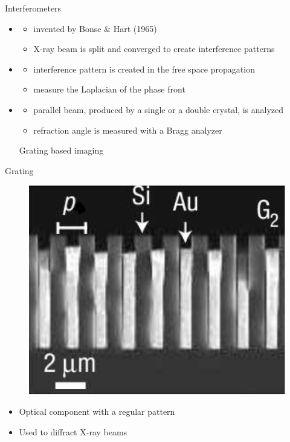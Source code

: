 \begin{frame}[c]{Interferometers}
    \begin{itemize}
        \setlength\itemsep{0.4cm}
        \item {}
              \begin{itemize}
                  \item invented by Bonse \& Hart (1965)
                  \item X-ray beam is split and converged to create interference patterns
              \end{itemize}
        \item {}
              \begin{itemize}
                  \item interference pattern is created in the free space propagation
                  \item measure the Laplacian of the phase front
              \end{itemize}
        \item {}
              \begin{itemize}
                  \item parallel beam, produced by a single or a double crystal, is analyzed
                  \item refraction angle is measured with a Bragg analyzer

              \end{itemize}
              \bolditem Grating based imaging
    \end{itemize}
\end{frame}

\begin{frame}{Grating}
    \begin{figure}
        \includegraphics[width=0.45\linewidth]{images/grating.eps}
    \end{figure}
    \begin{itemize}
        \item Optical component with a regular pattern
        \item Used to diffract X-ray beams
    \end{itemize}
\end{frame}


